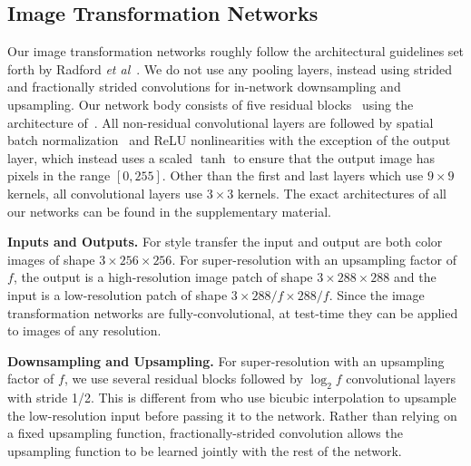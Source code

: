 \documentclass[runningheads]{llncs}
\newcommand{\etal}{\textit{et al}}
\begin{document}
\subsection{Image Transformation Networks}
\label{sec:arch}
Our image transformation networks roughly follow the architectural guidelines set forth
by Radford \etal~\cite{radford2015unsupervised}. We do not use any pooling layers, instead
using strided and fractionally strided convolutions for in-network downsampling and upsampling.
Our network body consists of five residual blocks~\cite{he2015deep} using the architecture
of~\cite{gross2016training}. All non-residual convolutional layers are followed by spatial batch
normalization~\cite{ioffe2015batch} and ReLU nonlinearities with the exception of the output
layer, which instead uses a scaled $\tanh$ to ensure that the output image has pixels in the
range $[0, 255]$. Other than the first and last layers which use $9\times9$ kernels, all
convolutional layers use $3\times3$ kernels. The exact architectures of all our networks
can be found in the supplementary material.


\vspace{1mm}
\noindent \textbf{Inputs and Outputs.}
For style transfer the input and output are both color images of shape $3\times256\times256$.
For super-resolution with an upsampling factor of $f$, the output is a high-resolution image
patch of shape $3\times288\times288$ and the input is a low-resolution patch of shape
$3\times288/f\times288/f$. Since the image transformation networks are fully-convolutional,
at test-time they can be applied to images of any resolution.

\vspace{1mm}
\noindent \textbf{Downsampling and Upsampling.}
For super-resolution with an upsampling factor of $f$, we use several residual
blocks followed by $\log_2f$ convolutional layers with stride 1/2. This is different from
\cite{dong2015image} who use bicubic interpolation to upsample the low-resolution input
before passing it to the network. Rather than relying on a fixed upsampling function,
fractionally-strided convolution allows the upsampling function to be learned jointly with
the rest of the network.
\end{document}
